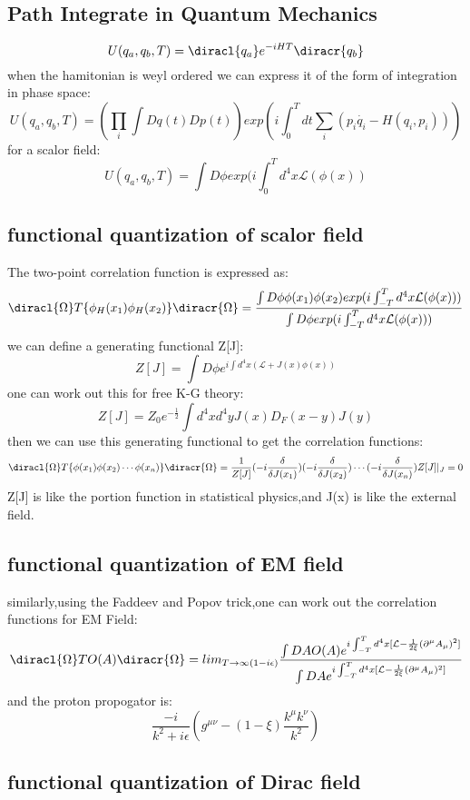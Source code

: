 \subsection{Path Integrate in Quantum Mechanics}
\[U(q_a,q_b,T)=\diracl{q_a}e^{-iHT}\diracr{q_b}\]
when the hamitonian is weyl ordered we can express it of the form of integration in phase space:
\[U(q_a,q_b,T)=(\prod_i\int Dq(t)Dp(t))exp(i\int_0^Tdt\sum_i(p_i\dot{q_i}-H(q_i,p_i)))\]
for a scalor field:
\[U(q_a,q_b,T)=\int D\phi exp(i\int^T_{0}d^4x\mathcal{L}(\phi(x))\]
\subsection{functional quantization of scalor field}
The two-point correlation function is expressed as:
\[\diracl{\Omega}T\{\phi_H(x_1)\phi_H(x_2)\}\diracr{\Omega}=\frac{\int D\phi \phi(x_1)\phi(x_2)exp(i\int^T_{-T}d^4x\mathcal{L}(\phi(x)))}{\int D\phi exp(i\int^T_{-T}d^4x\mathcal{L}(\phi(x)))}\]
we can define a generating functional Z[J]:
\[Z[J]=\int D\phi e^{i\int d^4x(\mathcal{L}+J(x)\phi(x))}\]
one can work out this for free K-G theory:
\[Z[J]=Z_0e^{-\frac{1}{2}}\int d^4x d^4yJ(x)D_F(x-y)J(y)\]
then we can use this generating functional to get the correlation functions:
\[\diracl{\Omega}T\{\phi(x_1)\phi(x_2)\cdots\phi(x_n)\}\diracr{\Omega}=\frac{1}{Z[J]}(-i\frac{\delta}{\delta J(x_1)})(-i\frac{\delta}{\delta J(x_2)})\cdots(-i\frac{\delta}{\delta J(x_n)})Z[J]|_J=0\]
Z[J] is like the portion function in statistical physics,and J(x) is like the external field.\par
\subsection{functional quantization of EM field}
similarly,using the Faddeev and Popov trick,one can work out the correlation functions for EM Field:
\[\diracl{\Omega}TO(A)\diracr{\Omega}=lim_{T\rightarrow \infty(1-i\epsilon)}\frac{\int DA O(A)e^{i\int_{-T}^Td^4x[\mathcal{L}-\frac{1}{2\xi}(\partial^\mu A_\mu)^2]}}{\int DAe^{i\int_{-T}^Td^4x[\mathcal{L}-\frac{1}{2\xi}(\partial^\mu A_\mu)^2]}}\]
and the proton propogator is:
\[\frac{-i}{k^2+i\epsilon}(g^{\mu\nu}-(1-\xi)\frac{k^\mu k^\nu}{k^2})\]
\subsection{functional quantization of Dirac field}
